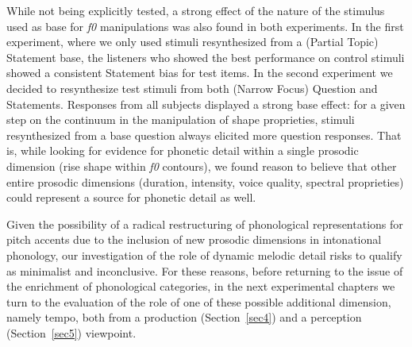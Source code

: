 While not being explicitly tested, a strong effect of the nature of the stimulus used as base for \textit{f0} manipulations was also found in both experiments. In the first experiment, where we only used stimuli resynthesized from a (Partial Topic) Statement base, the listeners who showed the best performance on control stimuli showed a consistent Statement bias for test items. In the second experiment we decided to resynthesize test stimuli from both (Narrow Focus) Question and Statements. Responses from all subjects displayed a strong base effect: for a given step on the continuum in the manipulation of shape proprieties, stimuli resynthesized from a base question always elicited more question responses. That is, while looking for evidence for phonetic detail within a single prosodic dimension (rise shape within \textit{f0} contours), we found reason to believe that other entire prosodic dimensions (duration, intensity, voice quality, spectral proprieties) could represent a source for phonetic detail as well.

\enlargethispage{\baselineskip}
Given the possibility of a radical restructuring of phonological representations for pitch accents due to the inclusion of new prosodic dimensions in intonational phonology, our investigation of the role of dynamic melodic detail risks to qualify as minimalist and inconclusive. For these reasons, before returning to the issue of the enrichment of phonological categories, in the next experimental chapters we turn to the evaluation of the role of one of these possible additional dimension, namely tempo, both from a production (Section~\ref{sec4}) and a perception (Section~\ref{sec5}) viewpoint.

